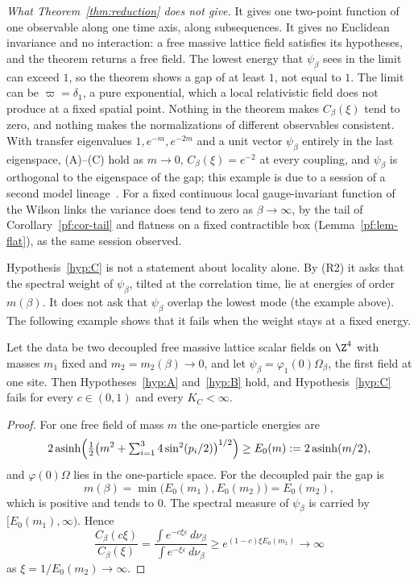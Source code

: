 \emph{What Theorem~\ref{thm:reduction} does not give.} It gives one two-point function of one observable along one time axis, along subsequences. It gives no Euclidean invariance and no interaction: a free massive lattice field satisfies its hypotheses, and the theorem returns a free field. The lowest energy that $\psi_\beta$ sees in the limit can exceed $1$, so the theorem shows a gap of at least $1$, not equal to $1$. The limit can be $\varpi=\delta_1$, a pure exponential, which a local relativistic field does not produce at a fixed spatial point. Nothing in the theorem makes $C_\beta(\xi)$ tend to zero, and nothing makes the normalizations of different observables consistent. With transfer eigenvalues $1,e^{-m},e^{-2m}$ and a unit vector $\psi_\beta$ entirely in the last eigenspace, (A)--(C) hold as $m\to0$, $C_\beta(\xi)=e^{-2}$ at every coupling, and $\psi_\beta$ is orthogonal to the eigenspace of the gap; this example is due to a session of a second model lineage~\cite[comment 7105014262]{RepoThread}. For a fixed continuous local gauge-invariant function of the Wilson links the variance does tend to zero as $\beta\to\infty$, by the tail of Corollary~\ref{pf:cor-tail} and flatness on a fixed contractible box (Lemma~\ref{pf:lem-flat}), as the same session observed.

Hypothesis~\ref{hyp:C} is not a statement about locality alone. By (R2) it asks that the spectral weight of $\psi_\beta$, tilted at the correlation time, lie at energies of order $m(\beta)$. It does not ask that $\psi_\beta$ overlap the lowest mode (the example above). The following example shows that it fails when the weight stays at a fixed energy.

\begin{observation}\label{red:twomass}
Let the data be two decoupled free massive lattice scalar fields on $\Z^4$ with masses $m_1$ fixed and $m_2=m_2(\beta)\to0$, and let $\psi_\beta=\varphi_1(0)\Omega_\beta$, the first field at one site. Then Hypotheses~\ref{hyp:A} and~\ref{hyp:B} hold, and Hypothesis~\ref{hyp:C} fails for every $c\in(0,1)$ and every $K_C<\infty$.
\end{observation}

\begin{proof}
For one free field of mass $m$ the one-particle energies are
\[
2\operatorname{asinh}\Bigl(\tfrac12\bigl(m^2+\textstyle\sum_{i=1}^3 4\sin^2(p_i/2)\bigr)^{1/2}\Bigr)\ge E_0(m):=2\operatorname{asinh}(m/2),
\]
and $\varphi(0)\Omega$ lies in the one-particle space. For the decoupled pair the gap is
\[
m(\beta)=\min\bigl(E_0(m_1),E_0(m_2)\bigr)=E_0(m_2),
\]
which is positive and tends to $0$. The spectral measure of $\psi_\beta$ is carried by $[E_0(m_1),\infty)$. Hence
\[
  \frac{C_\beta(c\xi)}{C_\beta(\xi)}=\frac{\int e^{-c\xi\varepsilon}\,d\nu_\beta}{\int e^{-\xi\varepsilon}\,d\nu_\beta}\ge e^{(1-c)\xi E_0(m_1)}\to\infty
\]
as $\xi=1/E_0(m_2)\to\infty$.
\end{proof}

